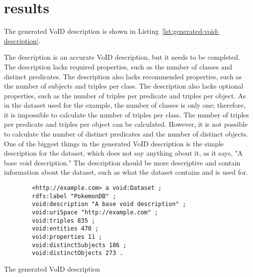 \section{results} \label{sec:results}
The generated VoID description is shown in Listing~\ref{lst:generated-void-description}.

The description is an accurate VoID description, but it needs to be completed. The description lacks required properties, such as the number of classes and distinct predicates. The description also lacks recommended properties, such as the number of subjects and triples per class. The description also lacks optional properties, such as the number of triples per predicate and triples per object. As in the dataset used for the example, the number of classes is only one; therefore, it is impossible to calculate the number of triples per class. The number of triples per predicate and triples per object can be calculated. However, it is not possible to calculate the number of distinct predicates and the number of distinct objects. One of the biggest things in the generated VoID description is the simple description for the dataset, which does not say anything about it, as it says, "A base void description." The description should be more descriptive and contain information about the dataset, such as what the dataset contains and is used for.

\begin{listing}[!ht]
    \begin{verbatim}          
        <http://example.com> a void:Dataset ;
        rdfs:label "PokemonDB" ;
        void:description "A base void description" ;
        void:uriSpace "http://example.com" ;
        void:triples 835 ;
        void:entities 470 ;
        void:properties 11 ;
        void:distinctSubjects 186 ;
        void:distinctObjects 273 .
    \end{verbatim}
    \caption{The generated VoID description}
    \label{lst:generated-void-description}
\end{listing}


